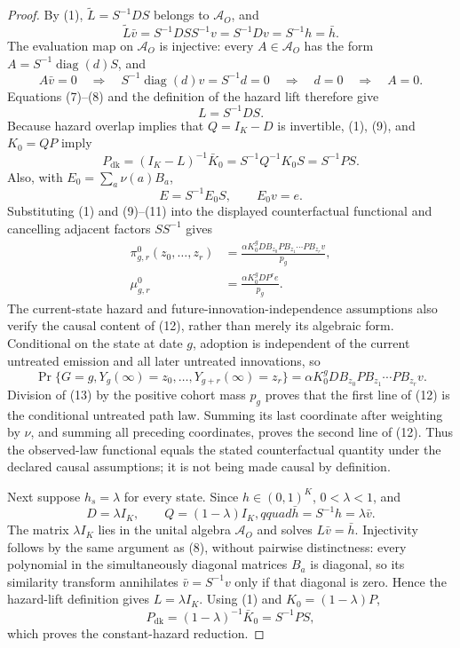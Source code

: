 \documentclass{article}
\begin{document}
\begin{proof}
By (1), \(\widetilde L=S^{-1}DS\) belongs to \(\mathcal A_O\), and
\[
 \widetilde L\bar v=S^{-1}DS S^{-1}v=S^{-1}Dv=S^{-1}h=\bar h.                  \tag{7}
\]
The evaluation map on \(\mathcal A_O\) is injective: every \(A\in\mathcal A_O\) has the form \(A=S^{-1}\operatorname{diag}(d)S\), and
\[
 A\bar v=0
 \quad\Longrightarrow\quad
 S^{-1}\operatorname{diag}(d)v=S^{-1}d=0
 \quad\Longrightarrow\quad d=0
 \quad\Longrightarrow\quad A=0.                                               \tag{8}
\]
Equations (7)--(8) and the definition of the hazard lift therefore give
\[
 L=S^{-1}DS.                                                                     \tag{9}
\]
Because hazard overlap implies that \(Q=I_K-D\) is invertible, (1), (9), and \(K_0=QP\) imply
\[
 P_{\mathrm{dk}}
 =(I_K-L)^{-1}\bar K_0
 =S^{-1}Q^{-1}K_0S
 =S^{-1}PS.                                                                       \tag{10}
\]
Also, with \(E_0=\sum_a\nu(a)B_a\),
\[
 E=S^{-1}E_0S,
 \qquad E_0v=e.                                                                  \tag{11}
\]
Substituting (1) and (9)--(11) into the displayed counterfactual functional and cancelling adjacent factors \(SS^{-1}\) gives
\[
 \begin{aligned}
 \pi^0_{g,r}(z_0,\ldots,z_r)
 &=\frac{\alpha K_0^gDB_{z_0}PB_{z_1}\cdots PB_{z_r}v}{p_g},\\
 \mu^0_{g,r}
 &=\frac{\alpha K_0^gDP^re}{p_g}.
 \end{aligned}                                                                  \tag{12}
\]
The current-state hazard and future-innovation-independence assumptions also verify the causal content of (12), rather than merely its algebraic form.  Conditional on the state at date \(g\), adoption is independent of the current untreated emission and all later untreated innovations, so
\[
 \Pr\{G=g,Y_g(\infty)=z_0,\ldots,Y_{g+r}(\infty)=z_r\}
 =\alpha K_0^gDB_{z_0}PB_{z_1}\cdots PB_{z_r}v.                                 \tag{13}
\]
Division of (13) by the positive cohort mass \(p_g\) proves that the first line of (12) is the conditional untreated path law.  Summing its last coordinate after weighting by \(\nu\), and summing all preceding coordinates, proves the second line of (12).  Thus the observed-law functional equals the stated counterfactual quantity under the declared causal assumptions; it is not being made causal by definition.

Next suppose \(h_s=\lambda\) for every state.  Since \(h\in(0,1)^K\), \(0<\lambda<1\), and
\[
 D=\lambda I_K,\qquad Q=(1-\lambda)I_K,qquad \bar h=S^{-1}h=\lambda\bar v.
\]
The matrix \(\lambda I_K\) lies in the unital algebra \(\mathcal A_O\) and solves \(L\bar v=\bar h\).  Injectivity follows by the same argument as (8), without pairwise distinctness: every polynomial in the simultaneously diagonal matrices \(B_a\) is diagonal, so its similarity transform annihilates \(\bar v=S^{-1}v\) only if that diagonal is zero.  Hence the hazard-lift definition gives \(L=\lambda I_K\).  Using (1) and \(K_0=(1-\lambda)P\),
\[
 P_{\mathrm{dk}}
 =(1-\lambda)^{-1}\bar K_0
 =S^{-1}PS,                                                                       \tag{14}
\]
which proves the constant-hazard reduction.


\end{proof}
\end{document}
